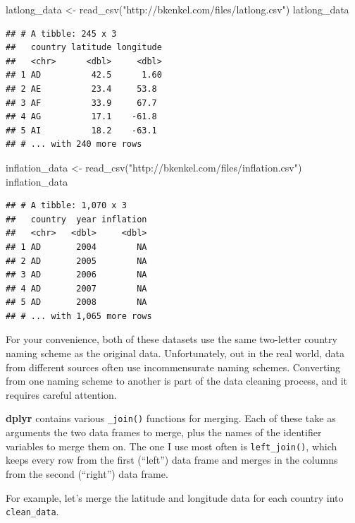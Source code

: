 \documentclass[
  12pt,
  oneside,openany]{book}
\newenvironment{Shaded}{\begin{snugshade}}{\end{snugshade}}
\newcommand{\FunctionTok}[1]{\textcolor[rgb]{0.00,0.00,0.00}{#1}}
\newcommand{\NormalTok}[1]{#1}
\newcommand{\OtherTok}[1]{\textcolor[rgb]{0.56,0.35,0.01}{#1}}
\newcommand{\StringTok}[1]{\textcolor[rgb]{0.31,0.60,0.02}{#1}}
\begin{document}
\begin{Shaded}
\begin{Highlighting}[]
\NormalTok{latlong\_data }\OtherTok{\textless{}{-}} \FunctionTok{read\_csv}\NormalTok{(}\StringTok{"http://bkenkel.com/files/latlong.csv"}\NormalTok{)}
\NormalTok{latlong\_data}
\end{Highlighting}
\end{Shaded}

\begin{verbatim}
## # A tibble: 245 x 3
##   country latitude longitude
##   <chr>      <dbl>     <dbl>
## 1 AD          42.5      1.60
## 2 AE          23.4     53.8 
## 3 AF          33.9     67.7 
## 4 AG          17.1    -61.8 
## 5 AI          18.2    -63.1 
## # ... with 240 more rows
\end{verbatim}

\begin{Shaded}
\begin{Highlighting}[]
\NormalTok{inflation\_data }\OtherTok{\textless{}{-}} \FunctionTok{read\_csv}\NormalTok{(}\StringTok{"http://bkenkel.com/files/inflation.csv"}\NormalTok{)}
\NormalTok{inflation\_data}
\end{Highlighting}
\end{Shaded}

\begin{verbatim}
## # A tibble: 1,070 x 3
##   country  year inflation
##   <chr>   <dbl>     <dbl>
## 1 AD       2004        NA
## 2 AD       2005        NA
## 3 AD       2006        NA
## 4 AD       2007        NA
## 5 AD       2008        NA
## # ... with 1,065 more rows
\end{verbatim}

For your convenience, both of these datasets use the same two-letter country naming scheme as the original data. Unfortunately, out in the real world, data from different sources often use incommensurate naming schemes. Converting from one naming scheme to another is part of the data cleaning process, and it requires careful attention.

\textbf{dplyr} contains various \texttt{\_join()} functions for merging. Each of these take as arguments the two data frames to merge, plus the names of the identifier variables to merge them on. The one I use most often is \texttt{left\_join()}, which keeps every row from the first (``left'') data frame and merges in the columns from the second (``right'') data frame.

For example, let's merge the latitude and longitude data for each country into \texttt{clean\_data}.
\end{document}
